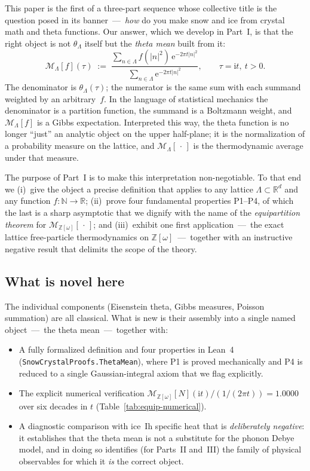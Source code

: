 \documentclass[11pt,letterpaper]{article}
\theoremstyle{plain}
\theoremstyle{definition}
\newcommand{\Eisenstein}{\mathbb{Z}[\omega]}
\newcommand{\R}{\mathbb{R}}
\newcommand{\N}{\mathbb{N}}
\newcommand{\Lat}{\Lambda}
\newcommand{\tmean}[1]{\mathcal{M}_{\Lat}[#1]}
\newcommand{\tmeaneis}[1]{\mathcal{M}_{\Eisenstein}[#1]}
\newcommand{\e}{\mathrm{e}}
\begin{document}
This paper is the first of a three-part sequence whose collective
title is the question posed in its banner~---~\emph{how} do you make
snow and ice from crystal math and theta functions.  Our answer,
which we develop in Part~I, is that the right object is not
$\theta_\Lat$ itself but the \emph{theta mean} built from it:
\begin{equation}\label{eq:theta-mean-intro}
  \tmean{f}(\tau) \;:=\;
    \frac{\displaystyle\sum_{n\in\Lat} f(|n|^2)\,\e^{-2\pi t |n|^2}}
         {\displaystyle\sum_{n\in\Lat} \e^{-2\pi t |n|^2}},
  \qquad \tau = \mathrm{i} t,\ t>0.
\end{equation}
The denominator is $\theta_\Lat(\tau)$; the numerator is the same
sum with each summand weighted by an arbitrary~$f$.  In the language
of statistical mechanics the denominator is a partition function,
the summand is a Boltzmann weight, and $\tmean{f}$ is a Gibbs
expectation.  Interpreted this way, the theta function is no longer
``just'' an analytic object on the upper half-plane; it is the
normalization of a probability measure on the lattice, and
$\tmean{\,\cdot\,}$ is the thermodynamic average under that measure.

The purpose of Part~I is to make this interpretation non-negotiable.
To that end we (i)~give the object a precise definition that applies
to any lattice $\Lat\subset\R^d$ and any function $f\colon\N\to\R$;
(ii)~prove four fundamental properties P1--P4, of which the last is
a sharp asymptotic that we dignify with the name of the
\emph{equipartition theorem} for $\tmeaneis{\,\cdot\,}$; and
(iii)~exhibit one first application~---~the exact lattice free-particle
thermodynamics on $\Eisenstein$~---~together with an instructive
negative result that delimits the scope of the theory.

\subsection*{What is novel here}
The individual components (Eisenstein theta, Gibbs measures, Poisson
summation) are all classical.  What is new is their assembly into a
single named object~---~the theta mean~---~together with:
\begin{itemize}[nosep]
\item A fully formalized definition and four properties in Lean~4
  (\texttt{SnowCrystalProofs.ThetaMean}), where P1 is proved
  mechanically and P4 is reduced to a single Gaussian-integral
  axiom that we flag explicitly.
\item The explicit numerical verification
  $\tmeaneis{N}(\mathrm{i} t)/(1/(2\pi t)) = 1.0000$ over six decades
  in $t$ (Table~\ref{tab:equip-numerical}).
\item A diagnostic comparison with ice~Ih specific heat that is
  \emph{deliberately negative}: it establishes that the theta mean
  is not a substitute for the phonon Debye model, and in doing so
  identifies (for Parts~II and~III) the family of physical
  observables for which it \emph{is} the correct object.
\end{itemize}
\end{document}
